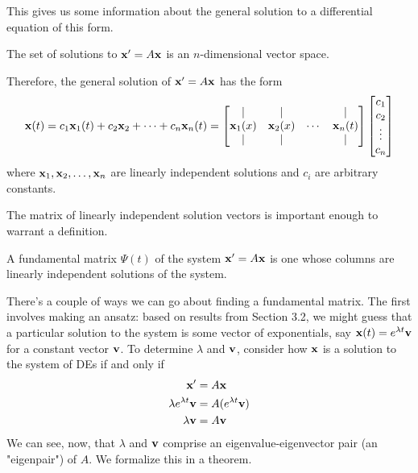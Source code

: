 \documentclass[../m082main.tex]{subfiles}
\begin{document}
This gives us some information about the general solution to a differential equation of this form.

\begin{corollary}
    The set of solutions to $\mathbf{x}' = A \mathbf{x}$ is an $n$-dimensional vector space.
\end{corollary}

Therefore, the general solution of $\mathbf{x}' = A \mathbf{x}$ has the form
\[ \mathbf{x}(t) = c_1 \mathbf{x}_1(t) + c_2 \mathbf{x}_2 + \cdots + c_n \mathbf{x}_n (t) = \begin{bmatrix} | & | &  & | \\ \mathbf{x}_1(x) & \mathbf{x}_2(x) & \cdots & \mathbf{x}_n(t) \\ | & | &  & | \end{bmatrix} \begin{bmatrix} c_1 \\ c_2 \\ \vdots \\ c_n \end{bmatrix} \]
where $\mathbf{x}_1, \mathbf{x}_2, \ldots, \mathbf{x}_n$ are linearly independent solutions and $c_i$ are arbitrary constants.

The matrix of linearly independent solution vectors is important enough to warrant a definition.

\begin{definition}
    A fundamental matrix $\Psi (t)$ of the system $\mathbf{x}' = A \mathbf{x}$ is one whose columns are linearly independent solutions of the system.
\end{definition}

There's a couple of ways we can go about finding a fundamental matrix.
The first involves making an ansatz: based on results from Section 3.2, we might guess that a particular solution to the system is some vector of exponentials, say $\mathbf{x}(t) = e^{\lambda t} \mathbf{v}$ for a constant vector $\mathbf{v}$.
To determine $\lambda$ and $\mathbf{v}$, consider how $\mathbf{x}$ is a solution to the system of DEs if and only if
\begin{align*}
    \mathbf{x}' &= A \mathbf{x} \\
    \lambda e^{\lambda t} \mathbf{v} &= A (e^{\lambda t} \mathbf{v}) \\
    \lambda \mathbf{v} &= A \mathbf{v}
\end{align*}
We can see, now, that $\lambda$ and $\mathbf{v}$ comprise an eigenvalue-eigenvector pair (an "eigenpair") of $A$.
We formalize this in a theorem.
\end{document}
